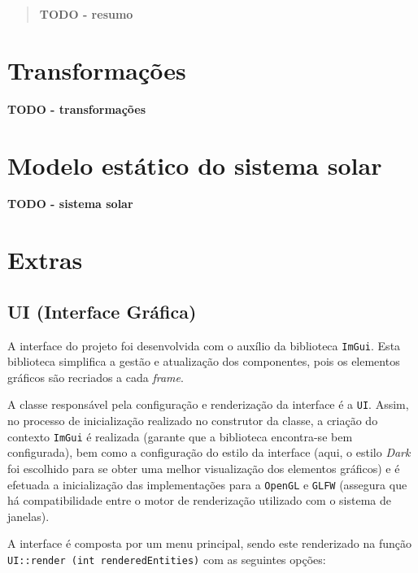 \documentclass[12pt, a4paper]{article}
\begin{document}
\pagebreak

\begin{abstract}
    \textbf{\color{red} TODO - resumo}
\end{abstract}

\section{Transformações}

\textbf{\color{red} TODO - transformações}

\section{Modelo estático do sistema solar}

\textbf{\color{red} TODO - sistema solar}

\section{Extras}

\subsection{UI (Interface Gráfica)}

A interface do projeto foi desenvolvida com o auxílio da biblioteca \texttt{ImGui}. Esta biblioteca
simplifica a gestão e atualização dos componentes, pois os elementos gráficos são recriados a cada
\textit{frame}.

A classe responsável pela configuração e renderização da interface é a \texttt{UI}.
Assim, no processo de inicialização realizado no construtor da classe, a criação do contexto
\texttt{ImGui} é realizada (garante que a biblioteca encontra-se bem configurada), bem como a
configuração do estilo da interface (aqui, o estilo \textit{Dark} foi escolhido para se obter uma
melhor visualização dos elementos gráficos) e é efetuada a inicialização das implementações para a
\texttt{OpenGL} e \texttt{GLFW} (assegura que há compatibilidade entre o motor de renderização
utilizado com o sistema de janelas).

A interface é composta por um menu principal, sendo este renderizado na função \texttt{UI::render
(int renderedEntities)} com as seguintes opções:
\end{document}
